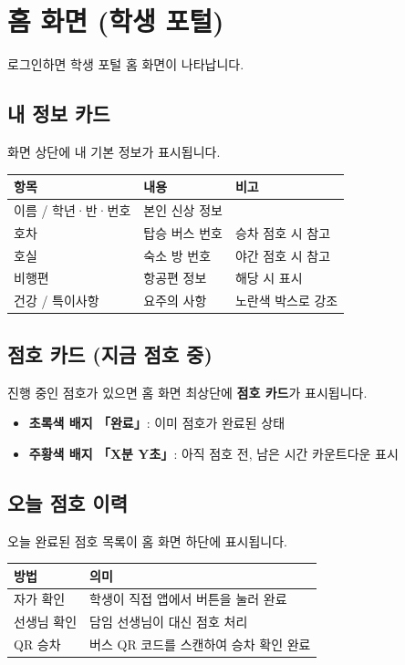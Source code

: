 \documentclass[a4paper,11pt]{article}
\begin{document}
\section{홈 화면 (학생 포털)}

로그인하면 학생 포털 홈 화면이 나타납니다.

\subsection{내 정보 카드}

화면 상단에 내 기본 정보가 표시됩니다.

\begin{center}
\begin{tabular}{@{}lll@{}}
  \toprule
  \textbf{항목} & \textbf{내용} & \textbf{비고} \\
  \midrule
  이름 / 학년·반·번호 & 본인 신상 정보 & \\
  호차 & 탑승 버스 번호 & 승차 점호 시 참고 \\
  호실 & 숙소 방 번호 & 야간 점호 시 참고 \\
  비행편 & 항공편 정보 & 해당 시 표시 \\
  건강 / 특이사항 & 요주의 사항 & 노란색 박스로 강조 \\
  \bottomrule
\end{tabular}
\end{center}

\subsection{점호 카드 (지금 점호 중)}

진행 중인 점호가 있으면 홈 화면 최상단에 \textbf{점호 카드}가 표시됩니다.

\begin{itemize}
  \item \textbf{초록색 배지 「완료」}: 이미 점호가 완료된 상태
  \item \textbf{주황색 배지 「X분 Y초」}: 아직 점호 전, 남은 시간 카운트다운 표시
\end{itemize}

\subsection{오늘 점호 이력}

오늘 완료된 점호 목록이 홈 화면 하단에 표시됩니다.

\begin{center}
\begin{tabular}{@{}ll@{}}
  \toprule
  \textbf{방법} & \textbf{의미} \\
  \midrule
  자가 확인 & 학생이 직접 앱에서 버튼을 눌러 완료 \\
  선생님 확인 & 담임 선생님이 대신 점호 처리 \\
  QR 승차 & 버스 QR 코드를 스캔하여 승차 확인 완료 \\
  \bottomrule
\end{tabular}
\end{center}
\end{document}
